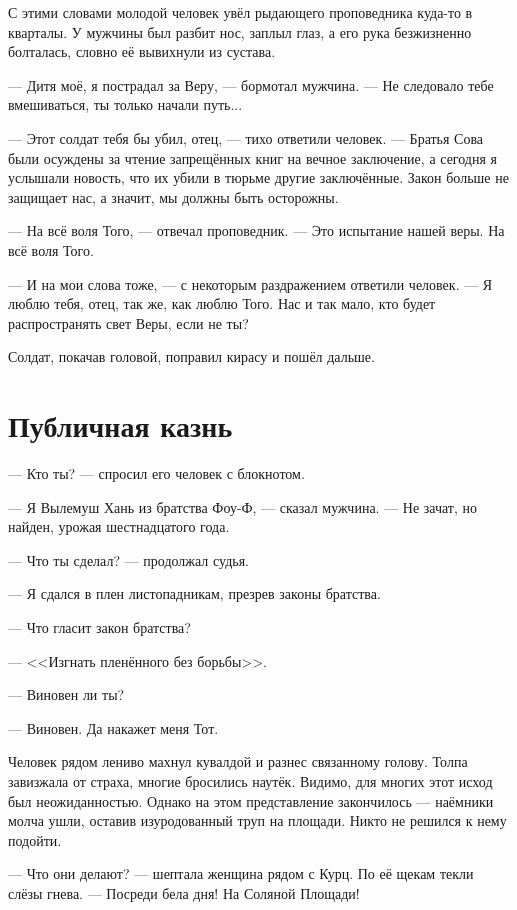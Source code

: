 С этими словами молодой человек увёл рыдающего проповедника куда-то в кварталы.
У мужчины был разбит нос, заплыл глаз, а его рука безжизненно болталась, словно её вывихнули из сустава.

--- Дитя моё, я пострадал за Веру, --- бормотал мужчина.
--- Не следовало тебе вмешиваться, ты только начали путь...

--- Этот солдат тебя бы убил, отец, --- тихо ответили человек.
--- Братья Сова были осуждены за чтение запрещённых книг на вечное заключение, а сегодня я услышали новость, что их убили в тюрьме другие заключённые.
Закон больше не защищает нас, а значит, мы должны быть осторожны.

--- На всё воля Того, --- отвечал проповедник.
--- Это испытание нашей веры.
На всё воля Того.

--- И на мои слова тоже, --- с некоторым раздражением ответили человек.
--- Я люблю тебя, отец, так же, как люблю Того.
Нас и так мало, кто будет распространять свет Веры, если не ты?

Солдат, покачав головой, поправил кирасу и пошёл дальше.

\section{Публичная казнь}

--- Кто ты? --- спросил его человек с блокнотом.

--- Я Вылемуш Хань из братства Фоу-Ф, --- сказал мужчина.
--- Не зачат, но найден, урожая шестнадцатого года.

--- Что ты сделал? --- продолжал судья.

--- Я сдался в плен листопадникам, презрев законы братства.

--- Что гласит закон братства?

--- <<Изгнать пленённого без борьбы>>.

--- Виновен ли ты?

--- Виновен.
Да накажет меня Тот.

Человек рядом лениво махнул кувалдой и разнес связанному голову.
Толпа завизжала от страха, многие бросились наутёк.
Видимо, для многих этот исход был неожиданностью.
Однако на этом представление закончилось --- наёмники молча ушли, оставив изуродованный труп на площади.
Никто не решился к нему подойти.

--- Что они делают? --- шептала женщина рядом с Курц.
По её щекам текли слёзы гнева.
--- Посреди бела дня!
На Соляной Площади!


